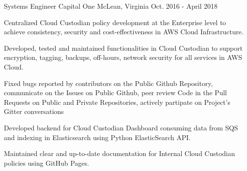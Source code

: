 \begin{cventries}
  \cventryemp
    {Systems Engineer} %
    {Capital One} %
    {McLean, Virginia} %
    {Oct. 2016 - April 2018} %
    {}
    {
      \begin{cvitems} %
        \item {Centralized Cloud Custodian policy development at the Enterprise level to achieve consistency, security and cost-effectiveness in AWS Cloud Infrastructure.}
        \item {Developed, tested and maintained functionalities in Cloud Custodian to support encryption, tagging, backups, off-hours, network security for all services in AWS Cloud.}
        \item {Fixed bugs reported by contributors on the Public Github Repository, communicate on the Issues on Public Github, peer review Code in the Pull Requests on Public and Private Repositories, actively partipate on Project's Gitter conversations}
        \item {Developed backend for Cloud Custodian Dashboard consuming data from SQS and indexing in Elasticsearch using Python ElasticSearch API.}
        \item {Maintained clear and up-to-date documentation for Internal Cloud Custodian policies using GitHub Pages.}
      \end{cvitems}
    }

\end{cventries}
